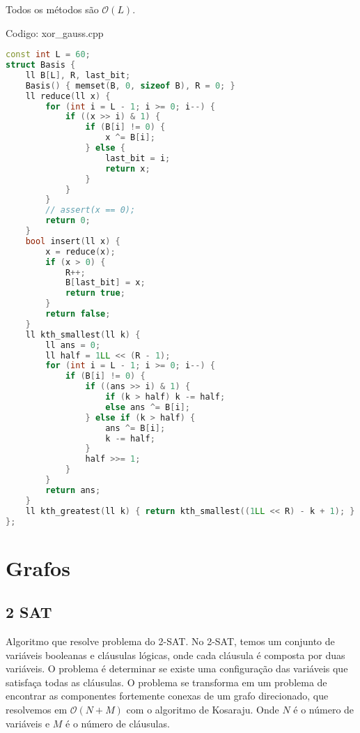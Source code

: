 \documentclass[10pt, a4paper, oneside]{book}
\begin{document}
Todos os métodos são $\mathcal{O}(L)$.
\hfill

Codigo: xor\_gauss.cpp

\begin{lstlisting}[language=C++]
const int L = 60;
struct Basis {
    ll B[L], R, last_bit;
    Basis() { memset(B, 0, sizeof B), R = 0; }
    ll reduce(ll x) {
        for (int i = L - 1; i >= 0; i--) {
            if ((x >> i) & 1) {
                if (B[i] != 0) {
                    x ^= B[i];
                } else {
                    last_bit = i;
                    return x;
                }
            }
        }
        // assert(x == 0);
        return 0;
    }
    bool insert(ll x) {
        x = reduce(x);
        if (x > 0) {
            R++;
            B[last_bit] = x;
            return true;
        }
        return false;
    }
    ll kth_smallest(ll k) {
        ll ans = 0;
        ll half = 1LL << (R - 1);
        for (int i = L - 1; i >= 0; i--) {
            if (B[i] != 0) {
                if ((ans >> i) & 1) {
                    if (k > half) k -= half;
                    else ans ^= B[i];
                } else if (k > half) {
                    ans ^= B[i];
                    k -= half;
                }
                half >>= 1;
            }
        }
        return ans;
    }
    ll kth_greatest(ll k) { return kth_smallest((1LL << R) - k + 1); }
};
\end{lstlisting}
\hfill

\newpage

%
%
%
%

\chapter{Grafos}

\section{2 SAT}


Algoritmo que resolve problema do 2-SAT. No 2-SAT, temos um conjunto de variáveis booleanas e cláusulas lógicas, onde cada cláusula é composta por duas variáveis. O problema é determinar se existe uma configuração das variáveis que satisfaça todas as cláusulas. O problema se transforma em um problema de encontrar as componentes fortemente conexas de um grafo direcionado, que resolvemos em $\mathcal{O}(N + M)$ com o algoritmo de Kosaraju. Onde $N$ é o número de variáveis e $M$ é o número de cláusulas.  
\end{document}
